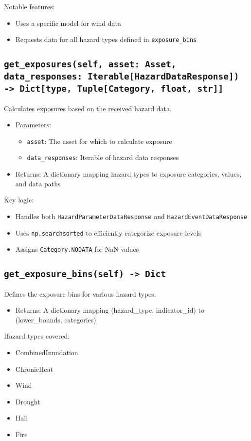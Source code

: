 \documentclass{article}
\begin{document}
Notable features:
\begin{itemize}
    \item Uses a specific model for wind data
    \item Requests data for all hazard types defined in \texttt{exposure\_bins}
\end{itemize}

\subsection{\texttt{get\_exposures(self, asset: Asset, data\_responses: Iterable[HazardDataResponse]) -> Dict[type, Tuple[Category, float, str]]}}
Calculates exposures based on the received hazard data.

\begin{itemize}
    \item Parameters:
    \begin{itemize}
        \item \texttt{asset}: The asset for which to calculate exposure
        \item \texttt{data\_responses}: Iterable of hazard data responses
    \end{itemize}
    \item Returns: A dictionary mapping hazard types to exposure categories, values, and data paths
\end{itemize}

Key logic:
\begin{itemize}
    \item Handles both \texttt{HazardParameterDataResponse} and \texttt{HazardEventDataResponse}
    \item Uses \texttt{np.searchsorted} to efficiently categorize exposure levels
    \item Assigns \texttt{Category.NODATA} for NaN values
\end{itemize}

\subsection{\texttt{get\_exposure\_bins(self) -> Dict}}
Defines the exposure bins for various hazard types.

\begin{itemize}
    \item Returns: A dictionary mapping (hazard\_type, indicator\_id) to (lower\_bounds, categories)
\end{itemize}

Hazard types covered:
\begin{itemize}
    \item CombinedInundation
    \item ChronicHeat
    \item Wind
    \item Drought
    \item Hail
    \item Fire
\end{itemize}
\end{document}
